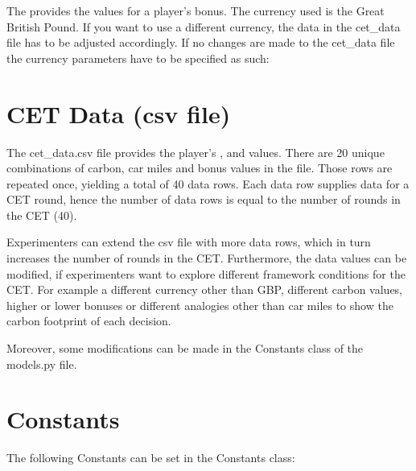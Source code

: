 \documentclass[letterpaper,10pt,english]{sphinxmanual}
\begin{document}
The {\hyperref[\detokenize{cet_data_csv:csv-file}]{}} provides the values for a player’s bonus. The currency used is the Great British Pound. If you want
to use a different currency, the data in the cet\_data file has to be adjusted accordingly. If no changes are made to
the cet\_data file the currency parameters have to be specified as such:

\begin{sphinxVerbatim}[commandchars=\\\{\}]
  
  
\end{sphinxVerbatim}




\section{CET Data (csv file)}
\label{\detokenize{cet_data_csv:cet-data-csv-file}}\label{\detokenize{cet_data_csv:csv-file}}\label{\detokenize{cet_data_csv::doc}}
The cet\_data.csv file provides the player’s {\hyperref[\detokenize{Player_fields:carbon-ref}]{}}, {\hyperref[\detokenize{Player_fields:car-miles-ref}]{}} and {\hyperref[\detokenize{Player_fields:bonus-ref}]{}} values.
There are 20 unique combinations of carbon, car miles and bonus values in the file. Those rows are repeated once,
yielding a total of 40 data rows. Each data row supplies data for a CET round, hence the number of data rows is
equal to the number of rounds in the CET (40).

Experimenters can extend the csv file with more data rows, which in turn increases the number of rounds in the CET.
Furthermore, the data values can be modified, if experimenters want to explore different framework conditions
for the CET. For example a different currency other than GBP, different carbon values, higher or lower bonuses or different analogies other than car miles
to show the carbon footprint of each decision.

Moreover, some modifications can be made in the Constants class of the models.py file.




\section{Constants}
\label{\detokenize{Constants:constants}}\label{\detokenize{Constants:id1}}\label{\detokenize{Constants::doc}}
The following Constants can be set in the Constants class:
\end{document}
